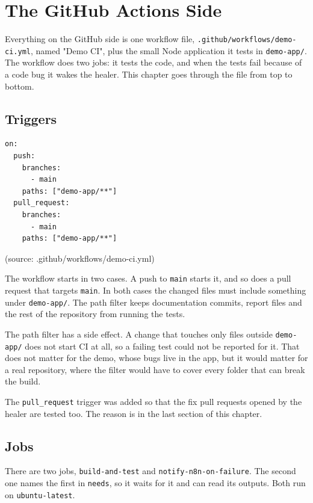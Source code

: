 \documentclass[11pt,a4paper]{report}
\begin{document}
\chapter{The GitHub Actions Side}

Everything on the GitHub side is one workflow file, \texttt{.\allowbreak{}github/\allowbreak{}workflows/\allowbreak{}demo-\allowbreak{}ci.\allowbreak{}yml}, named "Demo CI", plus the small Node application it tests in \texttt{demo-\allowbreak{}app/\allowbreak{}}. The workflow does two jobs: it tests the code, and when the tests fail because of a code bug it wakes the healer. This chapter goes through the file from top to bottom.

\section{Triggers}

\begin{lstlisting}
on:
  push:
    branches:
      - main
    paths: ["demo-app/**"]
  pull_request:
    branches:
      - main
    paths: ["demo-app/**"]
\end{lstlisting}

(source: .github/workflows/demo-ci.yml)

The workflow starts in two cases. A push to \texttt{main} starts it, and so does a pull request that targets \texttt{main}. In both cases the changed files must include something under \texttt{demo-\allowbreak{}app/\allowbreak{}}. The path filter keeps documentation commits, report files and the rest of the repository from running the tests.

The path filter has a side effect. A change that touches only files outside \texttt{demo-\allowbreak{}app/\allowbreak{}} does not start CI at all, so a failing test could not be reported for it. That does not matter for the demo, whose bugs live in the app, but it would matter for a real repository, where the filter would have to cover every folder that can break the build.

The \texttt{pull\_\allowbreak{}request} trigger was added so that the fix pull requests opened by the healer are tested too. The reason is in the last section of this chapter.

\section{Jobs}

There are two jobs, \texttt{build-\allowbreak{}and-\allowbreak{}test} and \texttt{notify-\allowbreak{}n8n-\allowbreak{}on-\allowbreak{}failure}. The second one names the first in \texttt{needs}, so it waits for it and can read its outputs. Both run on \texttt{ubuntu-\allowbreak{}latest}.
\end{document}
